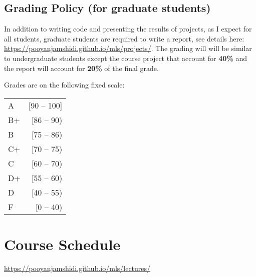 \documentclass[11pt]{article}
\begin{document}
\subsection*{Grading Policy (for graduate students)}
In addition to writing code and presenting the results of projects, as I expect for all students, graduate students are required to write a report, see details here: \url{https://pooyanjamshidi.github.io/mls/projects/}. The grading will will be similar to undergraduate students except the course project that account for \textbf{40\%} and the report will account for \textbf{20\%} of the final grade.


Grades are on the following fixed scale:

\begin{tabular}{lr}
A & [90 -- 100] \\
B+ &  [86 -- 90) \\
B & [75 -- 86)\\
C+  & [70 -- 75)\\
C&  [60 -- 70)\\
D+ &  [55 -- 60)\\
D & [40 -- 55)\\
F & [0 -- 40)\\

\end{tabular}




\section*{Course Schedule}
\url{https://pooyanjamshidi.github.io/mls/lectures/}
\end{document}
